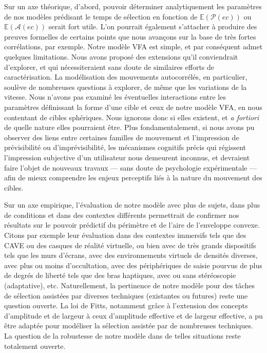	Sur un axe théorique, d'abord, pouvoir déterminer analytiquement les paramètres de nos modèles prédisant le temps de sélection en fonction de $\mathbb{E}(\mathcal{P}(ec))$ ou $\mathbb{E}(\mathcal{A}(ec))$ serait fort utile. L'on pourrait également s'attacher à produire des preuves formelles de certains points que nous avançons sur la base de très fortes corrélations, par exemple. Notre modèle VFA est simple, et par conséquent admet quelques limitations. Nous avons proposé des extensions qu'il conviendrait d'explorer, et qui nécessiteraient sans doute de similaires efforts de caractérisation. La modélisation des mouvements autocorrélés, en particulier, soulève de nombreuses questions à explorer, de même que les variations de la vitesse. Nous n'avons pas examiné les éventuelles interactions entre les paramètres définissant la forme d'une cible et ceux de notre modèle VFA, en nous contentant de cibles sphériques. Nous ignorons donc si elles existent, et \emph{a fortiori} de quelle nature elles pourraient être. Plus fondamentalement, si nous avons pu observer des liens entre certaines familles de mouvement et l'impression de prévisibilité ou d'imprévisibilité, les mécanismes cognitifs précis qui régissent l'impression subjective d'un utilisateur nous demeurent inconnus, et devraient faire l'objet de nouveaux travaux --- sans doute de psychologie expérimentale --- afin de mieux comprendre les enjeux perceptifs liés à la nature du mouvement des cibles.
	
	Sur un axe empirique, l'évaluation de notre modèle avec plus de sujets, dans plus de conditions et dans des contextes différents permettrait de confirmer nos résultats sur le pouvoir prédictif du périmètre et de l'aire de l'enveloppe convexe. Citons par exemple leur évaluation dans des contextes immersifs tels que des CAVE ou des casques de réalité virtuelle, ou bien avec de très grands dispositifs tels que les murs d'écrans, avec des environnements virtuels de densités diverses, avec plus ou moins d'occultation, avec des périphériques de saisie pourvus de plus de degrés de liberté tels que des bras haptiques, avec ou sans stéréoscopie (adaptative), etc. Naturellement, la pertinence de notre modèle pour des tâches de sélection assistées par diverses techniques (existantes ou futures) reste une question ouverte. La loi de Fitts, notamment grâce à l'extension des concepts d'amplitude et de largeur à ceux d'amplitude effective et de largeur effective, a pu être adaptée pour modéliser la sélection assistée par de nombreuses techniques. La question de la robustesse de notre modèle dans de telles situations reste totalement ouverte.
	
